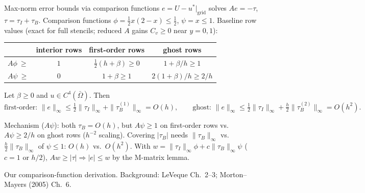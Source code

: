 \documentclass[aspectratio=169,8pt,t]{beamer}
\begin{document}
\begin{frame}{Max-norm error bounds via comparison functions}
\bodytop
\setlength{\abovedisplayskip}{3pt}\setlength{\belowdisplayskip}{3pt}
$e=U-u^*|_{\mathrm{grid}}$ solves $Ae=-\tau$, $\tau=\tau_I+\tau_B$. Comparison functions $\phi=\tfrac12x(2-x)\le\tfrac12$, $\psi=x\le1$. Baseline row values (exact for full stencils; reduced $A$ gains $C_v\ge0$ near $y=0,1$):
\blockgap
{\tabfont\begin{tabular}{@{}lccc@{}}\toprule
 & interior rows & first-order rows & ghost rows\\\midrule
$A\phi\ \ge$ & $1$ & $\tfrac12(h+\beta)\ge0$ & $1+\beta/h\ge1$\\
$A\psi\ \ge$ & $0$ & $1+\beta\ge1$ & $2(1+\beta)/h\ge2/h$\\\bottomrule
\end{tabular}}
\begin{theorem}
Let $\beta\ge0$ and $u\in C^4(\bar\Omega)$. Then
\[
\text{first-order: }\|e\|_\infty\le\tfrac12\|\tau_I\|_\infty+\|\tau_B^{(1)}\|_\infty=O(h),\qquad
\text{ghost: }\|e\|_\infty\le\tfrac12\|\tau_I\|_\infty+\tfrac h2\|\tau_B^{(2)}\|_\infty=O(h^2).
\]
\end{theorem}
\blockgap
Mechanism ($A\psi$): both $\tau_B=O(h)$, but $A\psi\ge1$ on first-order rows vs.\ $A\psi\ge2/h$ on ghost rows ($h^{-2}$ scaling). Covering $|\tau_B|$ needs $\|\tau_B\|_\infty$ vs.\ $\tfrac h2\|\tau_B\|_\infty$ of $\psi\le1$: $O(h)$ vs.\ $O(h^2)$. With $w=\|\tau_I\|_\infty\phi+c\|\tau_B\|_\infty\psi$ ($c=1$ or $h/2$), $Aw\ge|\tau|\Rightarrow|e|\le w$ by the M-matrix lemma.
\closing{Our comparison-function derivation. Background: LeVeque Ch.~2--3; Morton--Mayers (2005) Ch.~6.}
\end{frame}
\end{document}
